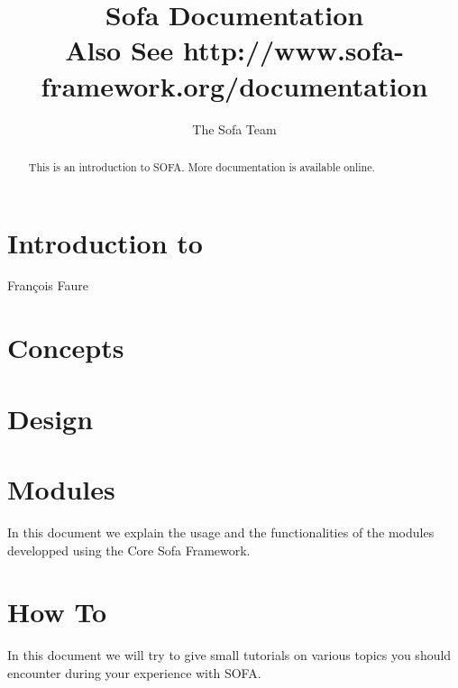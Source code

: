\documentclass[a4paper,10pt]{report}
\title{Sofa Documentation\\
\vspace{10mm}\normalsize{Also See \bf{http://www.sofa-framework.org/documentation} } }
\author{The Sofa Team}
\begin{document}
\maketitle

\begin{abstract}
This is an introduction to SOFA. More documentation is available online.
\end{abstract}

\tableofcontents

\chapter{Introduction to \sofa}
Fran\c{c}ois Faure

\graphicspath{{../introduction/}}  %


\chapter{Concepts}
\graphicspath{{../concepts/}}  %


\chapter{Design}
\graphicspath{{../design/}}  %



\chapter{Modules}
\graphicspath{{../modules/}}  %
In this document we explain the usage and the functionalities of the modules developped using the Core Sofa Framework.


\chapter{How To}
\graphicspath{{../HowTo/}}  %
In this document we will try to give small tutorials on various topics you should encounter during your experience with SOFA.

\end{document}
